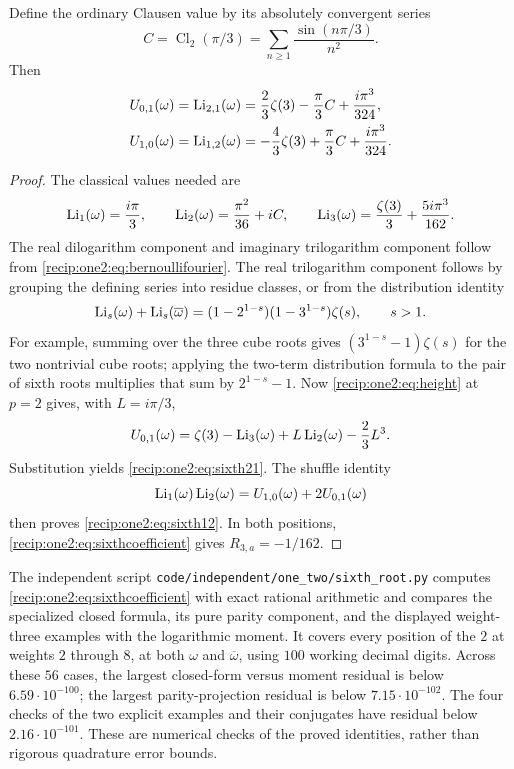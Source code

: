 \begin{corollary}
\label{recip:one2:ex:sixththree}
Define the ordinary Clausen value by its absolutely convergent series
\[
 C=\operatorname{Cl}_2(\pi/3)
   =\sum_{n\ge1}\frac{\sin(n\pi/3)}{n^2}.
\]
Then
\begin{align}
 U_{0,1}(\omega)=\operatorname{Li}_{2,1}(\omega)
  &=\frac23\zeta(3)-\frac\pi3 C+\frac{i\pi^3}{324},
    \label{recip:one2:eq:sixth21}\\
 U_{1,0}(\omega)=\operatorname{Li}_{1,2}(\omega)
  &=-\frac43\zeta(3)+\frac\pi3 C+\frac{i\pi^3}{324}.
    \label{recip:one2:eq:sixth12}
\end{align}
\end{corollary}
\begin{proof}
The classical values needed are
\[
 \operatorname{Li}_1(\omega)=\frac{i\pi}{3},\qquad
 \operatorname{Li}_2(\omega)=\frac{\pi^2}{36}+iC,\qquad
 \operatorname{Li}_3(\omega)=\frac{\zeta(3)}3+\frac{5i\pi^3}{162}.
\]
The real dilogarithm component and imaginary trilogarithm component
follow from \eqref{recip:one2:eq:bernoullifourier}.  The real
trilogarithm component follows by grouping the defining series
into residue classes, or from the distribution identity
\[
 \operatorname{Li}_s(\omega)+\operatorname{Li}_s(\overline\omega)
   =(1-2^{1-s})(1-3^{1-s})\zeta(s),\qquad s>1.
\]
For example, summing over the three cube roots gives
$(3^{1-s}-1)\zeta(s)$ for the two nontrivial cube roots;
applying the two-term distribution formula to the pair of sixth
roots multiplies that sum by $2^{1-s}-1$.
Now \eqref{recip:one2:eq:height} at $p=2$ gives, with $L=i\pi/3$,
\[
 U_{0,1}(\omega)
   =\zeta(3)-\operatorname{Li}_3(\omega)+L\operatorname{Li}_2(\omega)-\frac23L^3.
\]
Substitution yields \eqref{recip:one2:eq:sixth21}.  The shuffle identity
\[
 \operatorname{Li}_1(\omega)\operatorname{Li}_2(\omega)
     =U_{1,0}(\omega)+2U_{0,1}(\omega)
\]
then proves \eqref{recip:one2:eq:sixth12}.  In both positions,
\eqref{recip:one2:eq:sixthcoefficient} gives $R_{3,a}=-1/162$.
\end{proof}

The independent script \texttt{code/independent/one\_two/sixth\_root.py}
computes \eqref{recip:one2:eq:sixthcoefficient} with exact rational
arithmetic and compares the specialized closed formula, its pure
parity component, and the displayed weight-three examples with the
logarithmic moment.  It covers every position of the $2$ at weights
$2$ through $8$, at both $\omega$ and $\overline\omega$, using
$100$ working decimal digits.  Across these $56$ cases, the largest
closed-form versus moment residual is below $6.59\cdot10^{-100}$;
the largest parity-projection residual is below $7.15\cdot10^{-102}$.
The four checks of the two explicit examples and their conjugates
have residual below $2.16\cdot10^{-101}$.  These are numerical checks
of the proved identities, rather than rigorous quadrature error bounds.


